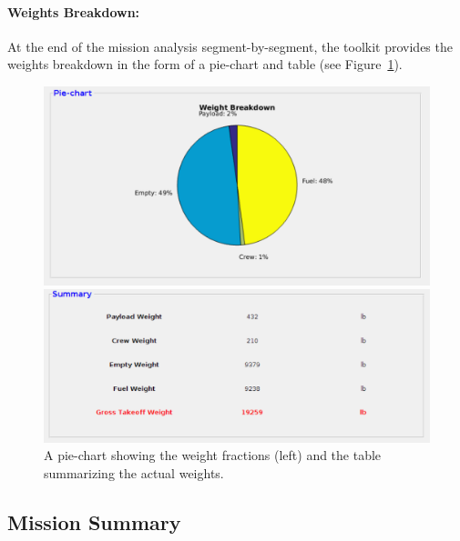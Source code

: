 \documentclass[pdftex,11pt,letter]{article}
\begin{document}
\paragraph{Weights Breakdown:}
At the end of the mission analysis segment-by-segment, the toolkit provides the weights breakdown in the form of a pie-chart and table (see Figure~\ref{weight_result}).
\begin{figure}[h]
\centering
\begin{minipage}[b]{0.48\linewidth}
\includegraphics[width=1.0\textwidth]{figures/pie_weight.pdf} 
\end{minipage}
\begin{minipage}[b]{0.48\linewidth}
   \includegraphics[width=1.0\textwidth]{figures/summary_weight.pdf} %
\end{minipage}
\caption{A pie-chart showing the weight fractions (left) and the table summarizing the actual weights.}
\label{weight_result}
\end{figure}

\subsection{Mission Summary}
\end{document}
